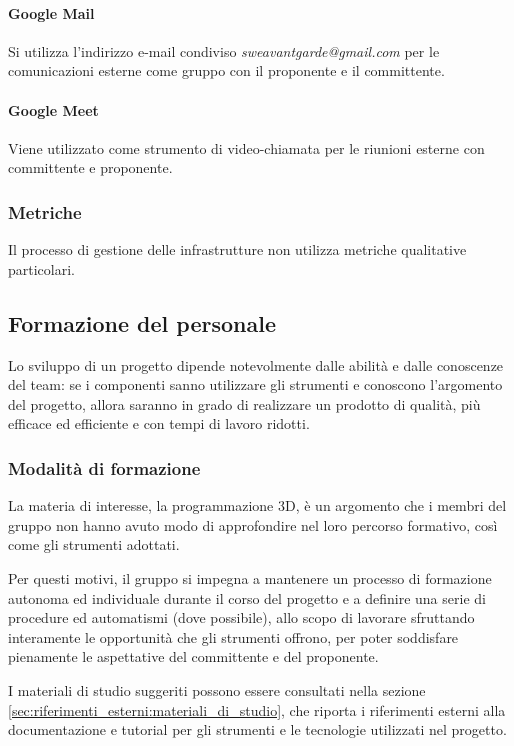 \paragraph{Google Mail}
Si utilizza l’indirizzo e-mail condiviso \textit{sweavantgarde@gmail.com} per le comunicazioni esterne come gruppo con il proponente e il committente.

\paragraph{Google Meet}
Viene utilizzato come strumento di video-chiamata per le riunioni esterne con committente e proponente.

\subsubsection{Metriche}\label{sec:processi_organizzativi:gestione_infrastrutture:metriche}
Il processo di gestione delle infrastrutture non utilizza metriche qualitative particolari.

\subsection{Formazione del personale}\label{sec:processi_organizzativi:formazione_personale}
Lo sviluppo di un progetto dipende notevolmente dalle abilità e dalle conoscenze del team: se i componenti sanno utilizzare gli strumenti e conoscono l'argomento del progetto, allora saranno in grado di realizzare un prodotto di qualità, più efficace ed efficiente e con tempi di lavoro ridotti.
\subsubsection{Modalità di formazione}
La materia di interesse, la programmazione 3D, è un argomento che i membri del gruppo non hanno avuto modo di approfondire nel loro percorso formativo, così come gli strumenti adottati.
\par Per questi motivi, il gruppo si impegna a mantenere un processo di formazione autonoma ed individuale durante il corso del progetto e a definire una serie di procedure ed automatismi (dove possibile), allo scopo di lavorare sfruttando interamente le opportunità che gli strumenti offrono, per poter soddisfare pienamente le aspettative del committente e del proponente.
\par I materiali di studio suggeriti possono essere consultati nella sezione \ref{sec:riferimenti_esterni:materiali_di_studio}, che riporta i riferimenti esterni alla documentazione e tutorial per gli strumenti e le tecnologie utilizzati nel progetto.


